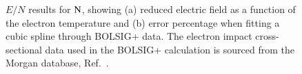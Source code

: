 \begin{figure}[!htbp]
\caption{$E/N$ results for $\rm N$, showing (a) reduced electric field as a function of the electron temperature and (b) error percentage when fitting a cubic spline through BOLSIG+ data. The electron impact cross-sectional data used in the BOLSIG+ calculation is sourced from the Morgan database, Ref.\ \cite{lxc:2024:morgan}.}
\label{fig:electronimpact_4}
\end{figure}
%
